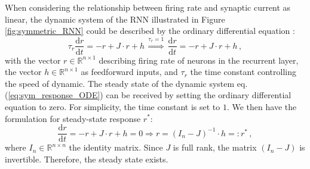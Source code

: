 \documentclass[11pt]{article}
\begin{document}
	When considering the relationship between firing rate and synaptic current as linear, the dynamic system of the RNN illustrated in Figure \ref{fig:symmetric_RNN} could be described by the ordinary differential equation  \cite{dayan2005theoretical}:
		\begin{equation} \label{eq:sym_response_ODE}
			\tau_r \frac{\mathrm{d} r}{\mathrm{d} t} = -r + J \cdot r + h \,  \overset{\tau_r = 1}{\Rightarrow} \, \frac{\mathrm{d} r}{\mathrm{d} t} = -r + J \cdot r + h\, , 
		\end{equation}
	with the vector $r \in \mathbb{R}^{n \times 1}$ describing firing rate of neurons in the recurrent layer, the vector $h \in \mathbb{R}^{n \times 1}$ as feedforward inputs, and $\tau_r$ the time constant controlling the speed of dynamic. 
	The steady state of the dynamic system eq.(\ref{eq:sym_response_ODE}) can be received by setting the ordinary differential equation to zero. For simplicity, the time constant is set to $1$. We then have the formulation for steady-state response $r^*$:
		\begin{equation} \label{eq:steady_state}
			\frac{\mathrm{d} r}{\mathrm{d} t} = -r + J \cdot r + h = 0 \Rightarrow r = (I_n - J)^{-1} \cdot h =: r^* \, ,
		\end{equation}
	where $I_n \in \mathbb{R}^{n \times n}$ the identity matrix. Since $J$ is full rank, the matrix $(I_n - J)$ is invertible. Therefore, the steady state exists.
	
\end{document}
